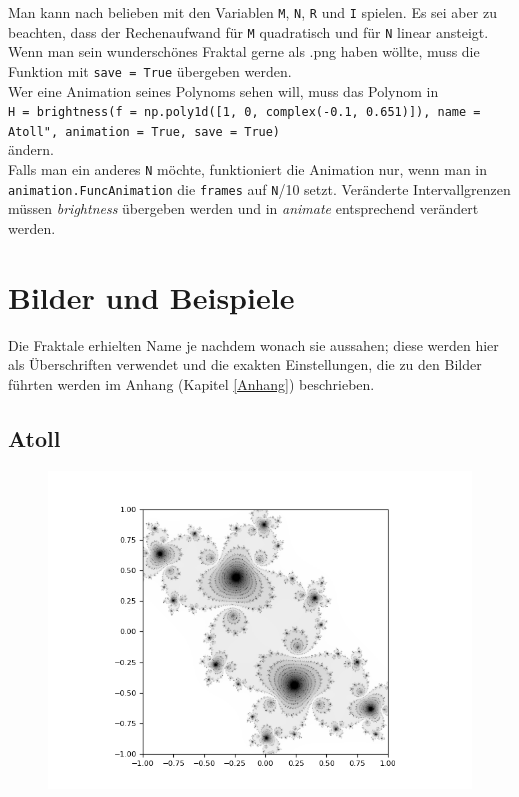 \documentclass[12pt]{scrartcl}
\newcommand\tab[1][1cm]{\hspace*{#1}}
\begin{document}
Man kann nach belieben mit den Variablen \texttt{M}, \texttt{N}, \texttt{R} und \texttt{I} spielen. Es sei aber zu beachten, dass der Rechenaufwand für \texttt{M} quadratisch und für \texttt{N} linear ansteigt.\\

Wenn man sein wunderschönes Fraktal gerne als .png haben wöllte, muss die Funktion mit \texttt{save = True} übergeben werden.\\

Wer eine Animation seines Polynoms sehen will, muss das Polynom in\\

\tab \texttt{H = brightness(f = np.poly1d([1, 0, complex(-0.1, 0.651)]), name = \\ \tab \tab \dq Atoll", animation = True, save = True)}\\

ändern.\\
Falls man ein anderes \texttt{N} möchte, funktioniert die Animation nur, wenn man in \texttt{animation.FuncAnimation} die \texttt{frames} auf \texttt{N}/10 setzt. Veränderte Intervallgrenzen müssen \textit{brightness} übergeben werden und in \textit{animate} entsprechend verändert werden.

\section{Bilder und Beispiele}\label{Bilder_und_Beispiele}
Die Fraktale erhielten Name je nachdem wonach sie aussahen; diese werden hier als Überschriften verwendet und die exakten Einstellungen, die zu den Bilder führten werden im Anhang (Kapitel \ref{Anhang}) beschrieben.

\subsection{Atoll}

\begin{figure}[H]
\centering
\includegraphics[scale=0.5]{Atoll0.png}
\caption{}
\label{Atoll0}
\end{figure}
\end{document}
